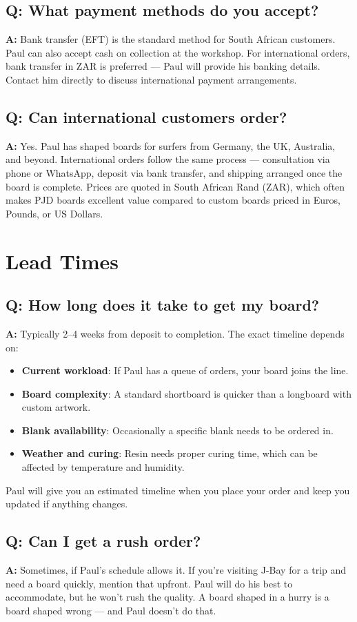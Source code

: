 \documentclass[11pt,a4paper]{article}
\newcommand{\question}[1]{\subsection*{Q: #1}}
\newcommand{\answer}{\noindent\textbf{A:} }
\begin{document}
\question{What payment methods do you accept?}
\answer Bank transfer (EFT) is the standard method for South African customers. Paul can also accept cash on collection at the workshop. For international orders, bank transfer in ZAR is preferred --- Paul will provide his banking details. Contact him directly to discuss international payment arrangements.

\question{Can international customers order?}
\answer Yes. Paul has shaped boards for surfers from Germany, the UK, Australia, and beyond. International orders follow the same process --- consultation via phone or WhatsApp, deposit via bank transfer, and shipping arranged once the board is complete. Prices are quoted in South African Rand (ZAR), which often makes PJD boards excellent value compared to custom boards priced in Euros, Pounds, or US Dollars.

\section{Lead Times}

\question{How long does it take to get my board?}
\answer Typically 2--4 weeks from deposit to completion. The exact timeline depends on:
\begin{itemize}[leftmargin=1.5em]
    \item \textbf{Current workload}: If Paul has a queue of orders, your board joins the line.
    \item \textbf{Board complexity}: A standard shortboard is quicker than a longboard with custom artwork.
    \item \textbf{Blank availability}: Occasionally a specific blank needs to be ordered in.
    \item \textbf{Weather and curing}: Resin needs proper curing time, which can be affected by temperature and humidity.
\end{itemize}
Paul will give you an estimated timeline when you place your order and keep you updated if anything changes.

\question{Can I get a rush order?}
\answer Sometimes, if Paul's schedule allows it. If you're visiting J-Bay for a trip and need a board quickly, mention that upfront. Paul will do his best to accommodate, but he won't rush the quality. A board shaped in a hurry is a board shaped wrong --- and Paul doesn't do that.
\end{document}
